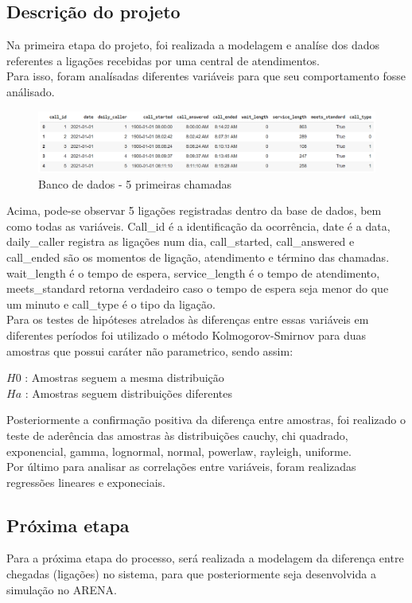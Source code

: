 \subsection{Descrição do projeto}
Na primeira etapa do projeto, foi realizada a modelagem e analíse dos dados referentes a ligações recebidas por uma central de atendimentos.\\
Para isso, foram analísadas diferentes variáveis para que seu comportamento fosse análisado.\\
\begin{figure}[ht]
    \includegraphics[scale= 0.6]{introducao/imgintro.png}
    \caption{Banco de dados - 5 primeiras chamadas}
    \label{fig: bd_img}
\end{figure}
Acima, pode-se observar 5 ligações registradas dentro da base de dados, bem como todas as variáveis. Call\_id é a identificação da ocorrência, date é a data, daily\_caller registra as ligações num dia, call\_started, call\_answered e call\_ended são os momentos de ligação, atendimento e término das chamadas. 
wait\_length é o tempo de espera,  service\_length é o tempo de atendimento, meets\_standard retorna verdadeiro caso o tempo de espera seja menor do que um minuto e call\_type é o tipo da ligação.\\
Para os testes de hipóteses atrelados às diferenças entre essas variáveis em diferentes períodos foi utilizado o método Kolmogorov-Smirnov para duas amostras que possui caráter não parametrico, sendo assim:\\
\begin{center}
$H{0}$ : Amostras seguem a mesma distribuição\\
$H{a}$ : Amostras seguem distribuições diferentes
\end{center}
Posteriormente a confirmação positiva da diferença entre amostras, foi realizado o teste de aderência das amostras às distribuições cauchy, chi quadrado, exponencial, gamma, lognormal, normal, powerlaw, rayleigh, uniforme.\\
Por último para analisar as correlações entre variáveis, foram realizadas regressões lineares e exponeciais.\\

\subsection{Próxima etapa}
Para a próxima etapa do processo, será realizada a modelagem da diferença entre chegadas (ligações) no sistema, para que posteriormente seja desenvolvida a simulação no ARENA.